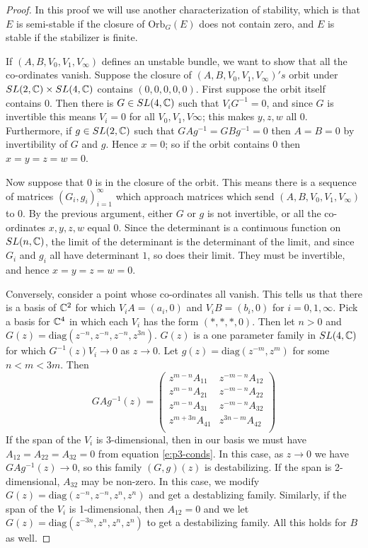 	\begin{proof}
		In this proof we will use another characterization of stability, which is that $E$ is semi-stable if the closure of $\text{Orb}_G(E)$ does not contain zero, and $E$ is stable if the stabilizer is finite. 
		
		If $(A,B,V_0,V_1,V_\infty)$ defines an unstable bundle, we want to show that all the co-ordinates vanish. Suppose the closure of $(A,B,V_0,V_1,V_\infty)'s$ orbit under $SL(2,\mathbb{C})\times SL(4,\mathbb{C})$ contains $(0,0,0,0,0)$. First suppose the orbit itself contains $0$. Then there is $G\in SL(4,\mathbb{C})$ such that $V_i G^{-1} =0$, and since $G$ is invertible this means $V_i = 0$ for all $V_0,V_1,V\infty$; this makes $y,z,w$ all 0. Furthermore, if $g\in SL(2,\mathbb{C})$ such that $GAg^{-1} = GBg^{-1} =0$ then $A=B=0$ by invertibility of $G$ and $g$. Hence $x=0$; so if the orbit contains $0$ then $x=y=z=w=0$. 
		
		Now suppose that $0$ is in the closure of the orbit. This means there is a sequence of matrices $(G_i,g_i)_{i=1}^\infty$ which approach matrices which send $(A,B,V_0,V_1,V_\infty)$ to $0$. By the previous argument, either $G$ or $g$ is not invertible, or all the co-ordinates $x,y,z,w$ equal 0. Since the determinant is a continuous function on $SL(n,\mathbb{C})$, the limit of the determinant is the determinant of the limit, and since $G_i$ and $g_i$ all have determinant $1$, so does their limit. They must be invertible, and hence $x=y=z=w=0$.\vspace{1em}
		
		
		Conversely, consider a point whose co-ordinates all vanish. This tells us that there is a basis of $\mathbb{C}^2$ for which $V_i A = (a_i,0)$ and $V_i B = (b_i ,0)$ for $i=0,1,\infty$. Pick a basis for $\mathbb{C}^4$ in which each $V_i$ has the form $(\ast,\ast,\ast,0)$. Then let $n>0$ and $G(z) = \text{diag}(z^{-n}, z^{-n}, z^{-n}, z^{3n})$. $G(z)$ is a one parameter family in $SL(4,\mathbb{C})$ for which $G^{-1}(z)V_i \to 0$ as $z\to 0$. Let $g(z) = \text{diag}(z^{-m}, z^{m})$ for some $n < m < 3m$. Then
		\begin{equation}
			GAg^{-1}(z) =
			\begin{pmatrix}
			z^{m-n} A_{11} & z^{-m-n}A_{12}\\
			z^{m-n} A_{21} & z^{-m-n}A_{22}\\
			z^{m-n} A_{31} & z^{-m-n}A_{32}\\
			z^{m+3n} A_{41} & z^{3n-m}A_{42}\\
			\end{pmatrix} 
		\end{equation}
		If the span of the $V_i$ is 3-dimensional, then in our basis we must have $A_{12}=A_{22}=A_{32}=0$ from equation \ref{e:p3-conds}. In this case, as $z\to 0$ we have $GAg^{-1}(z) \to 0$, so this family $(G,g)(z)$ is destabilizing. If the span is 2-dimensional, $A_{32}$ may be non-zero. In this case, we modify $G(z) = \text{diag}(z^{-n}, z^{-n}, z^n, z^n)$ and get a destablizing family. Similarly, if the span of the $V_i$ is 1-dimensional, then $A_{12}=0$ and we let $G(z) = \text{diag}(z^{-3n}, z^n, z^n, z^n)$ to get a destabilizing family. All this holds for $B$ as well.
		

\end{proof}
